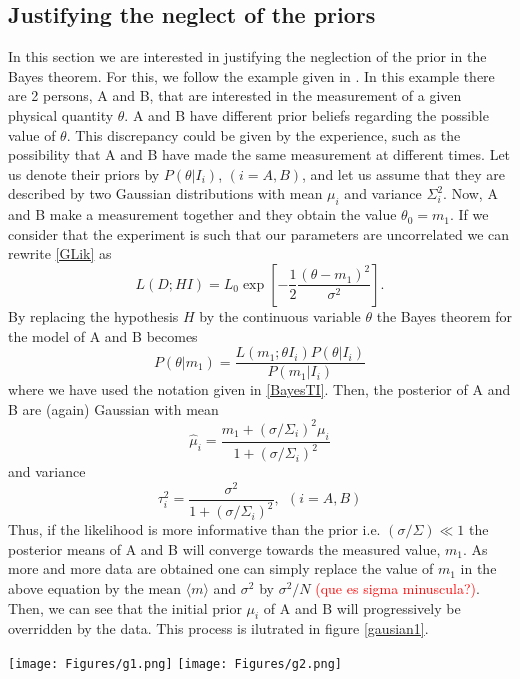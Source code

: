 \documentclass[onecolumn,           %
               showpacs,            %
               preprintnumbers,     %
               aps,                 %
               prl,          	    %
               letterpaper,             %
               superscriptaddress,      %
               nofootinbib,         %
               tightenlines,        %
               floats,floatfix      %
               ,usenatbib,
               ]{revtex4-1}
\begin{document}
\subsection{Justifying the neglect of the priors}

In this section we are interested in justifying the neglection of the prior in the Bayes theorem. For this, we follow the example given in \cite{RobT}. In this example there are 2 persons, A and B, that are interested in the measurement of a given physical quantity $\theta$. A and B have different prior beliefs regarding the possible value of $\theta$. This discrepancy could be given by the experience, such as the possibility that A and B have made the same measurement at different times. Let us denote their priors by $P(\theta|I_i)$, $(i=A,B)$, and let us assume that they are described by two Gaussian distributions with mean $\mu_i$ and variance $\Sigma_i^2$. Now, A and B make a measurement together and they obtain the value $\theta_0=m_1$. If we consider that the experiment is such that our parameters are uncorrelated we can rewrite \eqref{GLik} as
\begin{equation}\label{LikG}
L(D;HI)=L_0\exp\left[-\frac{1}{2}\frac{(\theta-m_1)^2}{\sigma^2}\right].
\end{equation}
By replacing the hypothesis $H$ by the continuous variable $\theta$ the Bayes theorem for the model of A and B becomes
\begin{equation}
P(\theta|m_1)=\frac{L(m_1;\theta I_i)P(\theta|I_i)}{P(m_1|I_i)}
\end{equation}
where we have used the notation given in \eqref{BayesTI}. Then, the posterior of A and B are (again) Gaussian with mean
\begin{equation}
\hat \mu_i = \frac{m_1+(\sigma/\Sigma_i)^2\mu_i}{1+(\sigma/\Sigma_i)^2}
\end{equation}
and variance 
\begin{equation}
\tau_i^2=\frac{\sigma^2}{1+(\sigma/\Sigma_i)^2}, \ \ (i=A,B)
\end{equation}
Thus, if the likelihood is more informative than the prior i.e. $(\sigma/\Sigma)\ll 1$ the posterior means of A and B will converge towards the measured value, $m_1$. As more and more data are obtained one can simply replace the value of $m_1$ in the above equation by the mean $\langle m\rangle$ and $\sigma^2$ by $\sigma^2/N$ \textcolor{red}{(que es sigma minuscula?)}. Then, we can see that the initial prior $\mu_i$ of A and B will progressively be overridden by the data. This process is ilutrated in figure \ref{gausian1}.
\begin{minipage}{\textwidth}
\centering
\texttt{[image: Figures/g1.png]}
\texttt{[image: Figures/g2.png]}
\label{gausian1}
\end{minipage}
\end{document}
